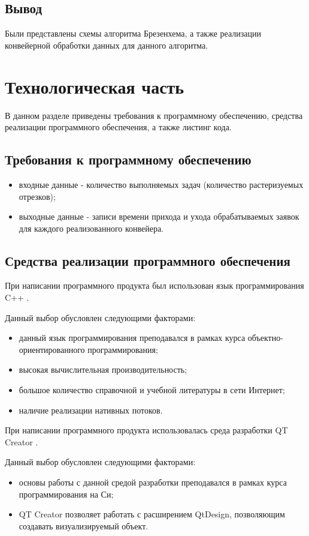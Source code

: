 \documentclass[12pt]{report}
\begin{document}
\newpage

\section*{Вывод}
Были представлены схемы алгоритма Брезенхема, а также реализации конвейерной обработки данных для данного алгоритма.

\chapter{Технологическая часть}
В данном разделе приведены требования к программному обеспечению, средства реализации программного обеспечения, а также листинг кода.

\section{Требования к программному обеспечению}
\begin{itemize}
\item входные данные - количество выполняемых задач (количество растеризуемых отрезков);
\item выходные данные - записи времени прихода и ухода обрабатываемых заявок для каждого реализованного конвейера.
\end{itemize}

\section{Средства реализации программного обеспечения}
При написании программного продукта был использован язык программирования C++ \cite{Cpp}.

Данный выбор обусловлен следующими факторами:
\begin{itemize}
\item данный язык программирования преподавался в рамках курса объектно-ориентированного программирования;
\item высокая вычислительная производительность;
\item большое количество справочной и учебной литературы в сети Интернет;
\item наличие реализации нативных потоков.
\end{itemize}

При написании программного продукта использовалась среда разработки QT Creator \cite{QT}.

Данный выбор обусловлен следующими факторами:
\begin{itemize}
\item основы работы с данной средой разработки преподавался в рамках курса программирования на Си;
\item QT Creator позволяет работать с расширением QtDesign, позволяющим создавать визуализируемый объект.
\end{itemize}
\end{document}
